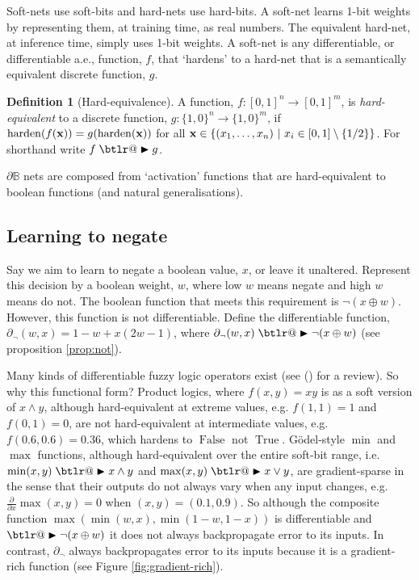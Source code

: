 \documentclass{article}
\makeatletter
\theoremstyle{plain}
\theoremstyle{definition}
\newtheorem{definition}[theorem]{Definition}
\theoremstyle{remark}
\DeclareRobustCommand{\btright}{\mathrel{\mathpalette\btlr@\blacktriangleright}}
\newcommand{\btlr@}[2]{%
	\begingroup
	\sbox\z@{$\m@th#1\triangleright$}%
	\sbox\tw@{\resizebox{1.1\wd\z@}{1.1\ht\z@}{\raisebox{\depth}{$\m@th#1\mkern-1mu#2$}}}%
	\ht\tw@=\ht\z@ \dp\tw@=\dp\z@ \wd\tw@=\wd\z@
	\copy\tw@
	\endgroup
}
\newcommand{\citemyauthoryear}[1]{\citeauthor{#1} (\citeyear{#1})}
\makeatother
\begin{document}
Soft-nets use soft-bits and hard-nets use hard-bits. A soft-net learns 1-bit weights by representing them, at training time, as real numbers. The equivalent hard-net, at inference time, simply uses 1-bit weights. 
A soft-net is any differentiable, or differentiable a.e., function, $f$, that `hardens' to a hard-net that is a semantically equivalent discrete function, $g$.

\begin{definition}[Hard-equivalence]
	A function, $f: [0,1]^n \rightarrow [0,1]^m$, is {\em hard-equivalent} to a discrete function, $g: \{1,0\}^n \rightarrow \{1,0\}^m$,	if $\operatorname{harden}(f({\bf x})) = g(\operatorname{harden}({\bf x}))$
	for all ${\bf x} \in \{(x_{1}, \dots, x_{n}) ~|~ x_{i} \in [0,1] \setminus \{1/2\}\}$. For shorthand write $f \btright g$.
\end{definition}

$\partial \mathbb{B}$ nets are composed from `activation' functions that are hard-equivalent to boolean functions (and natural generalisations).

\subsection{Learning to negate}

Say we aim to learn to negate a boolean value, $x$, or leave it unaltered. Represent this decision by a boolean weight, $w$, where low $w$ means negate and high $w$ means do not. The boolean function that meets this requirement is $\neg(x \oplus w)$. However, this function is not differentiable. Define the differentiable function,
$\partial_{\neg}(w, x) = 1 - w + x (2w - 1)$,
where $\partial_{\neg}(w, x) \btright \neg(x \oplus w)$ (see proposition \ref{prop:not}).

Many kinds of differentiable fuzzy logic operators exist (see \citemyauthoryear{VANKRIEKEN2022103602} for a review). So why this functional form? Product logics, where $f(x,y) = x y$ is as a soft version of $x \wedge y$, although hard-equivalent at extreme values, e.g. $f(1,1)=1$ and $f(0,1)=0$, are not hard-equivalent at intermediate values, e.g. $f(0.6, 0.6) = 0.36$, which hardens to $\operatorname{False}$ not $\operatorname{True}$. G\"{o}del-style $\operatorname{min}$ and $\operatorname{max}$ functions, although hard-equivalent over the entire soft-bit range, i.e. $\operatorname{min}(x,y) \btright x \wedge y$ and $\operatorname{max}(x,y) \btright x \vee y$, are gradient-sparse in the sense that their outputs do not always vary when any input changes, e.g. $\frac{\partial}{\partial x} \operatorname{max}(x,y) = 0$ when $(x,y)=(0.1, 0.9)$. So although the composite function $\operatorname{max}(\operatorname{min}(w, x), \operatorname{min}(1-w, 1-x))$ is differentiable and $\btright \neg(x \oplus w)$ it does not always backpropagate error to its inputs. In contrast, $\partial_{\neg}$ always backpropagates error to its inputs because it is a gradient-rich function (see Figure \ref{fig:gradient-rich}). 
\end{document}
